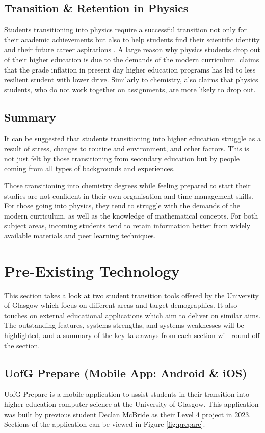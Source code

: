\documentclass{l4proj}
\begin{document}
\subsection{Transition \& Retention in Physics}
Students transitioning into physics require a successful transition not only for their academic achievements but also to help students find their scientific identity and their future career aspirations \citep{mcloughlin2024supporting}. A large reason why physics students drop out of their higher education is due to the demands of the modern curriculum. \citet{slavin2008factors} claims that the grade inflation in present day higher education programs has led to less resilient student with lower drive. Similarly to chemistry,  \citet{slavin2008factors} also claims that physics students, who do not work together on assignments, are more likely to drop out.

\subsection{Summary}
It can be suggested that students transitioning into higher education struggle as a result of stress,  changes to routine and environment,  and other factors. This is not just felt by those transitioning from secondary education but by people coming from all types of backgrounds and experiences.

Those transitioning into chemistry degrees while feeling prepared to start their studies are not confident in their own organisation and time management skills. For those going into physics,  they tend to struggle with the demands of the modern curriculum,  as well as the knowledge of mathematical concepts. For both subject areas,  incoming students tend to retain information better from widely available materials and peer learning techniques.

\section{Pre-Existing Technology}
This section takes a look at two student transition tools offered by the University of Glasgow which focus on different areas and target demographics. It also touches on external educational applications which aim to deliver on similar aims. The outstanding features,  systems strengths,  and systems weaknesses will be highlighted,  and a summary of the key takeaways from each section will round off the section.

\subsection{UofG Prepare (Mobile App: Android \& iOS)}
UofG Prepare is a mobile application to assist students in their transition into higher education computer science at the University of Glasgow. This application was built by previous student Declan McBride as their Level 4 project in 2023. Sections of the application can be viewed in Figure \ref{fig:prepare}.
\end{document}

